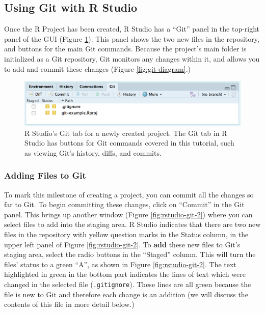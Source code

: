 \documentclass[
  american,
  ,doc,floatsintext]{apa6}
\begin{document}
\hypertarget{using-git-with-r-studio}{%
\subsection{Using Git with R Studio}\label{using-git-with-r-studio}}

Once the R Project has been created, R Studio has a \enquote{Git} panel in the top-right panel of the GUI (Figure \ref{fig:rstudio-git-1}). This panel shows the two new files in the repository, and buttons for the main Git commands. Because the project's main folder is initialized as a Git repository, Git monitors any changes within it, and allows you to add and commit these changes (Figure \ref{fig:git-diagram}.)

\begin{figure}

{\centering \includegraphics{images/rstudio-git-1} 

}

\caption{R Studio's Git tab for a newly created project. The Git tab in R Studio has buttons for Git commands covered in this tutorial, such as viewing Git's history, diffs, and commits.}\label{fig:rstudio-git-1}
\end{figure}

\hypertarget{adding-files-to-git}{%
\subsubsection{Adding Files to Git}\label{adding-files-to-git}}

To mark this milestone of creating a project, you can commit all the changes so far to Git. To begin committing these changes, click on \enquote{Commit} in the Git panel. This brings up another window (Figure \ref{fig:rstudio-git-2}) where you can select files to add into the staging area. R Studio indicates that there are two new files in the repository with yellow question marks in the Status column, in the upper left panel of Figure \ref{fig:rstudio-git-2}. To \textbf{add} these new files to Git's staging area, select the radio buttons in the \enquote{Staged} column. This will turn the files' status to a green \enquote{A}, as shown in Figure \ref{fig:rstudio-git-2}. The text highlighted in green in the bottom part indicates the lines of text which were changed in the selected file (\texttt{.gitignore}). These lines are all green because the file is new to Git and therefore each change is an addition (we will discuss the contents of this file in more detail below.)
\end{document}
